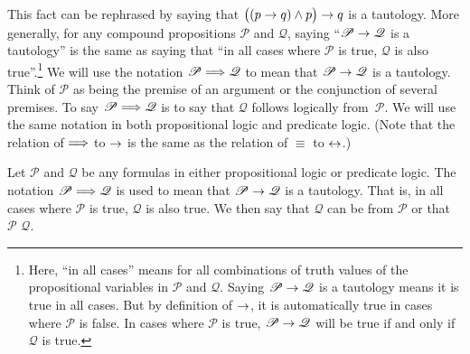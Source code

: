 This fact can be rephrased by saying that $\big((p\rightarrow q)\wedge p\big)\rightarrow q$
is a tautology.  More generally, for any compound propositions $\mathscr{P}$
and $\mathscr{Q}$, saying ``$\mathscr{P}\rightarrow \mathscr{Q}$ is
a tautology'' is the same as saying that ``in all cases where $\mathscr{P}$
is true, $\mathscr{Q}$ is also true''.\footnote{Here, ``in all cases'' means
for all combinations of truth values of the propositional variables
in $\mathscr{P}$ and $\mathscr{Q}$.  Saying $\mathscr{P}\rightarrow \mathscr{Q}$ is
a tautology means it is true in all cases.  But by definition of 
$\rightarrow$, it is automatically true in cases where $\mathscr{P}$ is
false.  In cases where $\mathscr{P}$ is true, $\mathscr{P}\rightarrow \mathscr{Q}$
will be true if and only if $\mathscr{Q}$ is true.}
We will use the notation $\mathscr{P}\Longrightarrow\mathscr{Q}$ to
mean that $\mathscr{P}\rightarrow \mathscr{Q}$ is a tautology.
Think of $\mathscr{P}$ as being the premise of an argument or
the conjunction of several premises.  To say $\mathscr{P}\Longrightarrow\mathscr{Q}$
is to say that $\mathscr{Q}$ follows logically from~$\mathscr{P}$.
We will use the same notation in both propositional logic and
predicate logic.  (Note that the relation of $\Longrightarrow$ to $\rightarrow$ is
the same as the relation of $\equiv$ to $\leftrightarrow$.)


\begin{definition}
Let $\mathscr{P}$ and $\mathscr{Q}$ be any formulas in either
propositional logic or predicate logic.  The notation
$\mathscr{P}\Longrightarrow\mathscr{Q}$ is used to mean that
$\mathscr{P}\rightarrow\mathscr{Q}$ is a tautology.  That is,
in all cases where $\mathscr{P}$ is true, $\mathscr{Q}$ is
also true.  We then say that $\mathscr{Q}$ can be
 from $\mathscr{P}$ or that
$\mathscr{P}$  $\mathscr{Q}$.
\end{definition}

